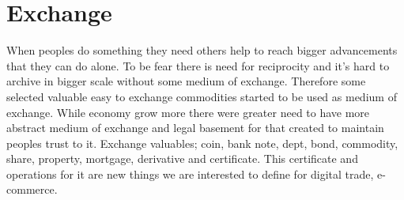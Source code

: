 \section{Exchange}
\label{exhange}
When peoples do something they need others help to reach bigger advancements that they can do alone. To be fear there is need for reciprocity and it's hard to archive in bigger scale without some medium of exchange. Therefore some selected valuable easy to exchange commodities started to be used as medium of exchange. While economy grow more there were greater need to have more abstract medium of exchange and legal basement for that created to maintain peoples trust to it. Exchange valuables; coin, bank note, dept, bond, commodity, share, property, mortgage, derivative and certificate. This certificate and operations for it are new things we are interested to define for digital trade, e-commerce.



